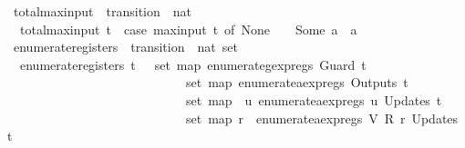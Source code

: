\begin{isabellebody}
\isanewline
{}\isamarkupfalse%
\ total{\isacharunderscore}max{\isacharunderscore}input\ {\isacharcolon}{\isacharcolon}\ {\isachardoublequoteopen}transition\ {\isasymRightarrow}\ nat{\isachardoublequoteclose}\ \isanewline
\ \ {\isachardoublequoteopen}total{\isacharunderscore}max{\isacharunderscore}input\ t\ {\isacharequal}\ {\isacharparenleft}case\ max{\isacharunderscore}input\ t\ of\ None\ {\isasymRightarrow}\ {}\ {\isacharbar}\ Some\ a\ {\isasymRightarrow}\ a{\isacharparenright}{\isachardoublequoteclose}\isanewline
\isanewline
{}\isamarkupfalse%
\ enumerate{\isacharunderscore}registers\ {\isacharcolon}{\isacharcolon}\ {\isachardoublequoteopen}transition\ {\isasymRightarrow}\ nat\ set{\isachardoublequoteclose}\ \isanewline
\ \ {\isachardoublequoteopen}enumerate{\isacharunderscore}registers\ t\ {\isacharequal}\ {\isacharparenleft}{\isasymUnion}\ {\isacharparenleft}set\ {\isacharparenleft}map\ enumerate{\isacharunderscore}gexp{\isacharunderscore}regs\ {\isacharparenleft}Guard\ t{\isacharparenright}{\isacharparenright}{\isacharparenright}{\isacharparenright}\ {\isasymunion}\isanewline
\ \ \ \ \ \ \ \ \ \ \ \ \ \ \ \ \ \ \ \ \ \ \ \ \ \ \ {\isacharparenleft}{\isasymUnion}\ {\isacharparenleft}set\ {\isacharparenleft}map\ enumerate{\isacharunderscore}aexp{\isacharunderscore}regs\ {\isacharparenleft}Outputs\ t{\isacharparenright}{\isacharparenright}{\isacharparenright}{\isacharparenright}\ {\isasymunion}\isanewline
\ \ \ \ \ \ \ \ \ \ \ \ \ \ \ \ \ \ \ \ \ \ \ \ \ \ \ {\isacharparenleft}{\isasymUnion}\ {\isacharparenleft}set\ {\isacharparenleft}map\ {\isacharparenleft}{\isasymlambda}{\isacharparenleft}{\isacharunderscore}{\isacharcomma}\ u{\isacharparenright}{\isachardot}\ enumerate{\isacharunderscore}aexp{\isacharunderscore}regs\ u{\isacharparenright}\ {\isacharparenleft}Updates\ t{\isacharparenright}{\isacharparenright}{\isacharparenright}{\isacharparenright}\ {\isasymunion}\isanewline
\ \ \ \ \ \ \ \ \ \ \ \ \ \ \ \ \ \ \ \ \ \ \ \ \ \ \ {\isacharparenleft}{\isasymUnion}\ {\isacharparenleft}set\ {\isacharparenleft}map\ {\isacharparenleft}{\isasymlambda}{\isacharparenleft}r{\isacharcomma}\ {\isacharunderscore}{\isacharparenright}{\isachardot}\ enumerate{\isacharunderscore}aexp{\isacharunderscore}regs\ {\isacharparenleft}V\ {\isacharparenleft}R\ r{\isacharparenright}{\isacharparenright}{\isacharparenright}\ {\isacharparenleft}Updates\ t{\isacharparenright}{\isacharparenright}{\isacharparenright}{\isacharparenright}{\isachardoublequoteclose}\isanewline
\isanewline
{}\isamarkupfalse%

\end{isabellebody}
